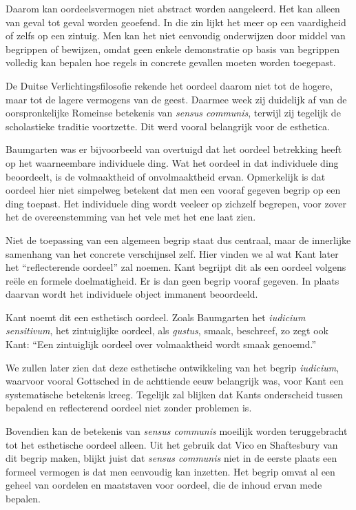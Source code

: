 Daarom kan oordeelsvermogen niet abstract worden aangeleerd. Het kan alleen van geval tot geval worden geoefend. In die zin lijkt het meer op een vaardigheid of zelfs op een zintuig. Men kan het niet eenvoudig onderwijzen door middel van begrippen of bewijzen, omdat geen enkele demonstratie op basis van begrippen volledig kan bepalen hoe regels in concrete gevallen moeten worden toegepast.

De Duitse Verlichtingsfilosofie rekende het oordeel daarom niet tot de hogere, maar tot de lagere vermogens van de geest. Daarmee week zij duidelijk af van de oorspronkelijke Romeinse betekenis van \textit{sensus communis}, terwijl zij tegelijk de scholastieke traditie voortzette. Dit werd vooral belangrijk voor de esthetica.

Baumgarten was er bijvoorbeeld van overtuigd dat het oordeel betrekking heeft op het waarneembare individuele ding. Wat het oordeel in dat individuele ding beoordeelt, is de volmaaktheid of onvolmaaktheid ervan. Opmerkelijk is dat oordeel hier niet simpelweg betekent dat men een vooraf gegeven begrip op een ding toepast. Het individuele ding wordt veeleer op zichzelf begrepen, voor zover het de overeenstemming van het vele met het ene laat zien.

Niet de toepassing van een algemeen begrip staat dus centraal, maar de innerlijke samenhang van het concrete verschijnsel zelf. Hier vinden we al wat Kant later het ``reflecterende oordeel'' zal noemen. Kant begrijpt dit als een oordeel volgens reële en formele doelmatigheid. Er is dan geen begrip vooraf gegeven. In plaats daarvan wordt het individuele object immanent beoordeeld.

Kant noemt dit een esthetisch oordeel. Zoals Baumgarten het \textit{iudicium sensitivum}, het zintuiglijke oordeel, als \textit{gustus}, smaak, beschreef, zo zegt ook Kant: ``Een zintuiglijk oordeel over volmaaktheid wordt smaak genoemd.''

We zullen later zien dat deze esthetische ontwikkeling van het begrip \textit{iudicium}, waarvoor vooral Gottsched in de achttiende eeuw belangrijk was, voor Kant een systematische betekenis kreeg. Tegelijk zal blijken dat Kants onderscheid tussen bepalend en reflecterend oordeel niet zonder problemen is.

Bovendien kan de betekenis van \textit{sensus communis} moeilijk worden teruggebracht tot het esthetische oordeel alleen. Uit het gebruik dat Vico en Shaftesbury van dit begrip maken, blijkt juist dat \textit{sensus communis} niet in de eerste plaats een formeel vermogen is dat men eenvoudig kan inzetten. Het begrip omvat al een geheel van oordelen en maatstaven voor oordeel, die de inhoud ervan mede bepalen.

